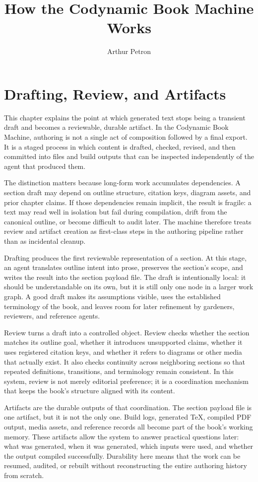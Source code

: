\documentclass[11pt]{article}
\title{How the Codynamic Book Machine Works}
\author{Arthur Petron}
\begin{document}
\section*{Drafting, Review, and Artifacts}

This chapter explains the point at which generated text stops being a transient draft and becomes a reviewable, durable artifact. In the Codynamic Book Machine, authoring is not a single act of composition followed by a final export. It is a staged process in which content is drafted, checked, revised, and then committed into files and build outputs that can be inspected independently of the agent that produced them.

The distinction matters because long-form work accumulates dependencies. A section draft may depend on outline structure, citation keys, diagram assets, and prior chapter claims. If those dependencies remain implicit, the result is fragile: a text may read well in isolation but fail during compilation, drift from the canonical outline, or become difficult to audit later. The machine therefore treats review and artifact creation as first-class steps in the authoring pipeline rather than as incidental cleanup.

Drafting produces the first reviewable representation of a section. At this stage, an agent translates outline intent into prose, preserves the section's scope, and writes the result into the section payload file. The draft is intentionally local: it should be understandable on its own, but it is still only one node in a larger work graph. A good draft makes its assumptions visible, uses the established terminology of the book, and leaves room for later refinement by gardeners, reviewers, and reference agents.

Review turns a draft into a controlled object. Review checks whether the section matches its outline goal, whether it introduces unsupported claims, whether it uses registered citation keys, and whether it refers to diagrams or other media that actually exist. It also checks continuity across neighboring sections so that repeated definitions, transitions, and terminology remain consistent. In this system, review is not merely editorial preference; it is a coordination mechanism that keeps the book's structure aligned with its content.

Artifacts are the durable outputs of that coordination. The section payload file is one artifact, but it is not the only one. Build logs, generated \TeX{}, compiled PDF output, media assets, and reference records all become part of the book's working memory. These artifacts allow the system to answer practical questions later: what was generated, when it was generated, which inputs were used, and whether the output compiled successfully. Durability here means that the work can be resumed, audited, or rebuilt without reconstructing the entire authoring history from scratch.
\end{document}
